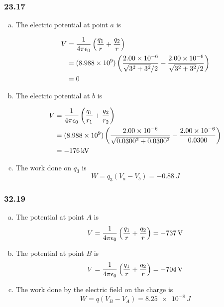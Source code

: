 \documentclass{article}
\begin{document}
\subsubsection{23.17}

\begin{enumerate}[a)]
  \item The electric potential at point $a$ is

        \begin{align*}
          V & = \frac{1}{4 \pi \epsilon_0} \left( \frac{q_1}{r} + \frac{q_2}{r} \right)                                                                       \\
            & = (\num{8.988e9}) \left( \frac{\num{2.00e-6}}{\sqrt{3^2 + 3^2} / 2} - \frac{\num{2.00e-6}}{\sqrt{3^2 + 3^2} / 2} \right) \\
            & = 0
        \end{align*}

  \item The electric potential at $b$ is

        \begin{align*}
          V & = \frac{1}{4 \pi \epsilon_0} \left( \frac{q_1}{r_1} + \frac{q_2}{r_2} \right)                                                           \\
            & = (\num{8.988e9}) \left( \frac{\num{2.00e-6}}{\sqrt{0.0300^2 + 0.0300^2}} - \frac{\num{2.00e-6}}{0.0300} \right) \\
            & = \qty{-176}{kV}
        \end{align*}

  \item The work done on $q_3$ is \[W = q_3 (V_a - V_b) = \qty{-0.88}{J}\]
\end{enumerate}

\subsubsection{32.19}

\begin{enumerate}[a)]
  \item The potential at point $A$ is \[V = \frac{1}{4 \pi \epsilon_0} \left( \frac{q_1}{r} + \frac{q_2}{r} \right) = \qty{-737}{V}\]

  \item The potential at point $B$ is \[V = \frac{1}{4 \pi \epsilon_0} \left( \frac{q_1}{r} + \frac{q_2}{r} \right) = \qty{-704}{V}\]

  \item The work done by the electric field on the charge is \[W = q (V_B - V_A) = \qty{8.25e-8}{J}\]
\end{enumerate}
\end{document}
